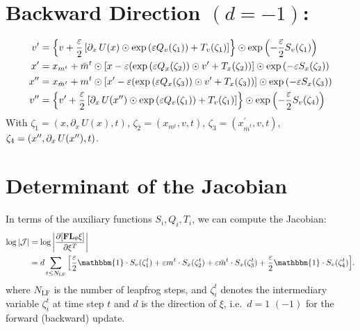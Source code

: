 \section{Backward Direction \texorpdfstring{$(d = -1)$}{(d = -1)}:}%
\label{sec:lf_backward}
%
\begin{align}
  v^{\prime} &= {\left\{v + \frac{\eps}{2}\left[\partial_{x}\,U(x)\odot
        \exp{\left(\eps Q_{v}(\zeta_{1})\right)}%
    + T_{v}(\zeta_{1})\right]\right\}} \odot
    \exp{\left(-\frac{\eps}{2}S_{v}(\zeta_{1})\right)} \\
  \xp &= x_{m^{t}} + \bar{m}^{t}\odot%
    {\left[x - \eps{\left(\exp{\left(\eps Q_{x}(\zeta_{2})\right)}\odot \vp%
    + T_{x}(\zeta_{2})\right)}\right]}\odot \exp{\left(-\eps
    S_{x}(\zeta_{2})\right)} \\ 
  \xpp &= x_{\bar{m}^{t}} + m^{t}\odot%
    {\left[\xp - \eps{\left(\exp{\left(\eps Q_{x}(\zeta_{3})\right)}\odot \vp%
    + T_{x}(\zeta_{3})\right)}\right]}\odot \exp{\left(-\eps
    S_{x}(\zeta_{3})\right)} \\
  v^{\prime\prime} &= {\left\{\vp +
      \frac{\eps}{2}\left[\partial_{x}\,U(\xpp)\odot%
        \exp{\left(\eps Q_{v}(\zeta_{1})\right)}
  + T_{v}(\zeta_{1})\right]\right\}}\odot 
    \exp{\left(-\frac{\eps}{2}S_{v}(\zeta_{4})\right)}
\label{eq:backward_update}
\end{align}
%
With $\zeta_{1} = (x, \partial_{x}\, U(x), t)$, $\zeta_{2} = (x_{m^{t}}, v,
t)$, $\zeta_{3} = (x^{\prime}_{\bar{m}^{t}}, v, t)$, $\zeta_{4} = ({x^{\prime\prime}},
\partial_{x}\, U({x^{\prime\prime}}), t)$.
%
\section{Determinant of the Jacobian}
In terms of the auxiliary functions $S_{i}, Q_{i}, T_{i}$, we can compute the
Jacobian:
%
\begin{align}
  \log|\mathcal{J}| 
  &= \log\bigg|\frac{\partial{\left[\mathbf{FL}_{\theta}\xi\right]}}{\partial
  \xi^{T}}\bigg|\\
  &= d \sum_{t\leq N_{\mathrm{LF}}}
    {\left[\frac{\eps}{2} \mathbbm{1}\cdot S_{v}(\zeta_{1}^{t}) + \eps m^{t}
        \cdot S_{x}(\zeta_{2}^{t}) 
      + \eps \bar{m}^{t} \cdot S_{x}(\zeta_{3}^{t}) + \frac{\eps}{2}\mathbbm{1}
\cdot S_{v}(\zeta_{4}^{t})\right]}.  \end{align}
%
where $N_{\mathrm{LF}}$ is the number of leapfrog steps, and $\zeta_{i}^{t}$
denotes the intermediary variable $\zeta_{i}^{t}$ at time step $t$ and $d$ is
the direction of $\xi$, i.e.\ $d = 1 \,\, (-1)$ for the forward (backward)
update.
%
